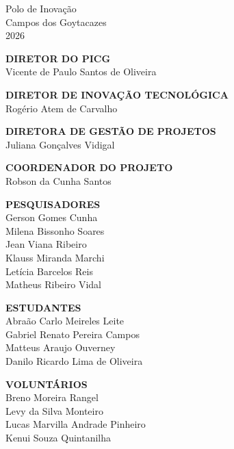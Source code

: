 \begin{center}
    \vfill
    \centering
    Polo de Inovação\\
    Campos dos Goytacazes\\
    2026

    \newpage

    \vfill
    \textbf{DIRETOR DO PICG}\\
    Vicente de Paulo Santos de Oliveira
    \vfill

    \textbf{DIRETOR DE INOVAÇÃO TECNOLÓGICA}\\
    Rogério Atem de Carvalho
    \vfill

    \textbf{DIRETORA DE GESTÃO DE PROJETOS}\\
    Juliana Gonçalves Vidigal
    \vfill

    \textbf{COORDENADOR DO PROJETO}\\
    Robson da Cunha Santos
    \vfill

    \textbf{PESQUISADORES}\\
    Gerson Gomes Cunha\\
    Milena Bissonho Soares\\
    Jean Viana Ribeiro \\
    Klauss Miranda Marchi \\
    Letícia Barcelos Reis \\
    Matheus Ribeiro Vidal
    \vfill

    \textbf{ESTUDANTES}\\
    Abraão Carlo Meireles Leite\\
    Gabriel Renato Pereira Campos\\
    Matteus Araujo Ouverney\\
    Danilo Ricardo Lima de Oliveira
    \vfill

    \textbf{VOLUNTÁRIOS}\\
    Breno Moreira Rangel\\
    Levy da Silva Monteiro\\
    Lucas Marvilla Andrade Pinheiro\\
    Kenui Souza Quintanilha
    \vfill
\end{center}
